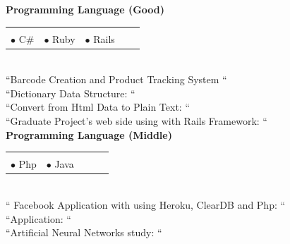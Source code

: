 \documentclass[10pt,a4paper]{article}
\begin{document}
{\bf Programming Language (Good)}\\
\hspace*{0.3in}\begin{tabular}{lrrrr}
\vspace{0.5 mm}\\
  $\bullet$ C$ \# $ &$\bullet$ Ruby &$\bullet$ Rails & &\\
\end{tabular}
\vspace{0.5 mm}\\
\hspace*{0.6in}\footnotesize{``Barcode Creation and Product Tracking System ``}\\
\hspace*{0.6in}\footnotesize{``Dictionary Data Structure: ``}\\
\hspace*{0.6in}\footnotesize{``Convert from Html Data to Plain Text: ``}\\
\hspace*{0.6in}\footnotesize{``Graduate Project's web side using with Rails Framework: ``}\\

{\bf Programming Language (Middle)}\\
\hspace*{0.3in}\begin{tabular}{lrrrr}
\vspace{0.5 mm}\\
  $\bullet$ Php &$\bullet$ Java & & &\\
\end{tabular}
\vspace{0.5 mm}\\
\hspace*{0.6in}\footnotesize{`` Facebook Application with using Heroku, ClearDB and Php: ``}\\
\hspace*{0.6in}\footnotesize{``Application: ``}\\
\hspace*{0.6in}\footnotesize{``Artificial Neural Networks study: ``}\\
\end{document}

